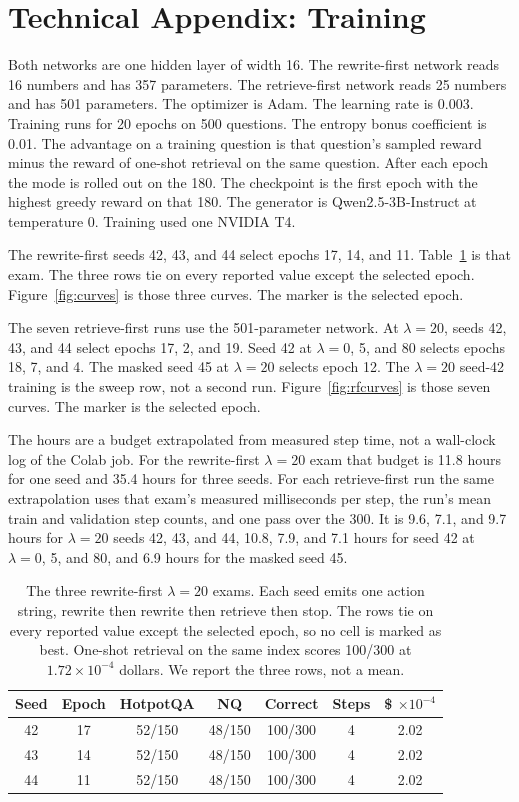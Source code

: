 \documentclass[letterpaper]{article} %
\begin{document}
\FloatBarrier
\section{Technical Appendix: Training}
Both networks are one hidden layer of width 16. The rewrite-first network reads 16 numbers and has 357 parameters. The retrieve-first network reads 25 numbers and has 501 parameters. The optimizer is Adam. The learning rate is 0.003. Training runs for 20 epochs on 500 questions. The entropy bonus coefficient is 0.01. The advantage on a training question is that question's sampled reward minus the reward of one-shot retrieval on the same question. After each epoch the mode is rolled out on the 180. The checkpoint is the first epoch with the highest greedy reward on that 180. The generator is Qwen2.5-3B-Instruct at temperature 0. Training used one NVIDIA T4.

The rewrite-first seeds 42, 43, and 44 select epochs 17, 14, and 11. Table~\ref{tab:learned} is that exam. The three rows tie on every reported value except the selected epoch. Figure~\ref{fig:curves} is those three curves. The marker is the selected epoch.

The seven retrieve-first runs use the 501-parameter network. At \(\lambda{=}20\), seeds 42, 43, and 44 select epochs 17, 2, and 19. Seed 42 at \(\lambda{=}0\), 5, and 80 selects epochs 18, 7, and 4. The masked seed 45 at \(\lambda{=}20\) selects epoch 12. The \(\lambda{=}20\) seed-42 training is the sweep row, not a second run. Figure~\ref{fig:rfcurves} is those seven curves. The marker is the selected epoch.

The hours are a budget extrapolated from measured step time, not a wall-clock log of the Colab job. For the rewrite-first \(\lambda{=}20\) exam that budget is 11.8 hours for one seed and 35.4 hours for three seeds. For each retrieve-first run the same extrapolation uses that exam's measured milliseconds per step, the run's mean train and validation step counts, and one pass over the 300. It is 9.6, 7.1, and 9.7 hours for \(\lambda{=}20\) seeds 42, 43, and 44, 10.8, 7.9, and 7.1 hours for seed 42 at \(\lambda{=}0\), 5, and 80, and 6.9 hours for the masked seed 45.

\begin{table}[t]
\centering
\small
\setlength{\tabcolsep}{3pt}
\begin{tabular}{ccccccc}
\toprule
Seed & Epoch & HotpotQA & NQ & Correct & Steps & \$ \(\times 10^{-4}\) \\
\midrule
42 & 17 & 52/150 & 48/150 & 100/300 & 4 & 2.02 \\
43 & 14 & 52/150 & 48/150 & 100/300 & 4 & 2.02 \\
44 & 11 & 52/150 & 48/150 & 100/300 & 4 & 2.02 \\
\bottomrule
\end{tabular}
\caption{The three rewrite-first \(\lambda{=}20\) exams. Each seed emits one action string, rewrite then rewrite then retrieve then stop. The rows tie on every reported value except the selected epoch, so no cell is marked as best. One-shot retrieval on the same index scores 100/300 at \(1.72\times 10^{-4}\) dollars. We report the three rows, not a mean.}
\label{tab:learned}
\end{table}
\end{document}
